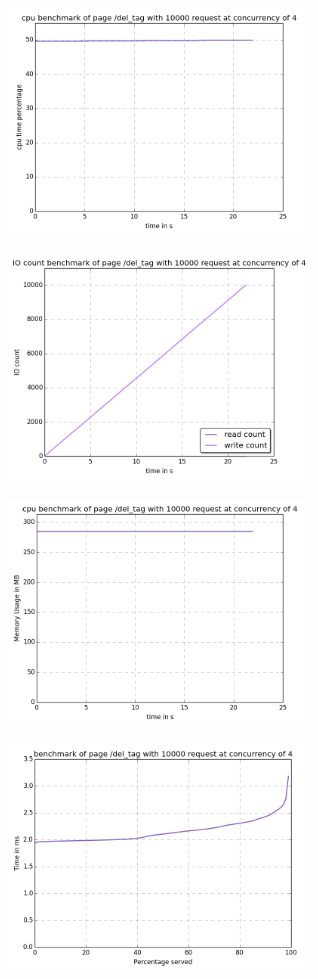 \begin{center}
\includegraphics[width=0.6\textwidth]{img/del_tag.cpu.png}



\includegraphics[width=0.6\textwidth]{img/del_tag.io-count.png}



\includegraphics[width=0.6\textwidth]{img/del_tag.mem.png}



\includegraphics[width=0.6\textwidth]{img/del_tag.serv-time.png}




\end{center}
